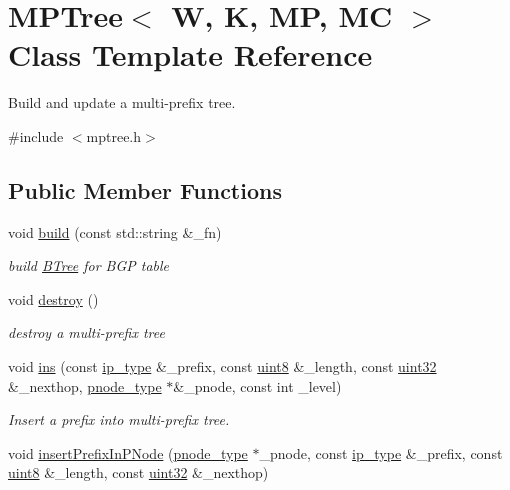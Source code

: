 \hypertarget{classMPTree}{\section{M\-P\-Tree$<$ W, K, M\-P, M\-C $>$ Class Template Reference}
\label{classMPTree}
}


Build and update a multi-\/prefix tree.  




{\ttfamily \#include $<$mptree.\-h$>$}

\subsection*{Public Member Functions}
\begin{DoxyCompactItemize}
\item 
void \hyperlink{classMPTree_af43cf4996e24c9d343923e4ea1db703a}{build} (const std\-::string \&\-\_\-fn)
\begin{DoxyCompactList}\small\item\em build \hyperlink{classBTree}{B\-Tree} for B\-G\-P table \end{DoxyCompactList}\item 
void \hyperlink{classMPTree_aadc3bf6841d9941a0a89101f9ad6eceb}{destroy} ()
\begin{DoxyCompactList}\small\item\em destroy a multi-\/prefix tree \end{DoxyCompactList}\item 
void \hyperlink{classMPTree_a0a3055fdb63dd614e55ec35630f6b48a}{ins} (const \hyperlink{classMPTree_a11032357a52017ffa6ad4e7ddedf3c23}{ip\-\_\-type} \&\-\_\-prefix, const \hyperlink{types_8h_a34ecedcf03a70dc91e4616212d79267d}{uint8} \&\-\_\-length, const \hyperlink{types_8h_abd01e8e67e3d94cab04ecaaf4f85ac1b}{uint32} \&\-\_\-nexthop, \hyperlink{classMPTree_aaccc544aa2a8703f51ca45951f37a279}{pnode\-\_\-type} $\ast$\&\-\_\-pnode, const int \-\_\-level)
\begin{DoxyCompactList}\small\item\em Insert a prefix into multi-\/prefix tree. \end{DoxyCompactList}\item 
void \hyperlink{classMPTree_a6008b5d92736c860bd15f1e2e60474f3}{insert\-Prefix\-In\-P\-Node} (\hyperlink{classMPTree_aaccc544aa2a8703f51ca45951f37a279}{pnode\-\_\-type} $\ast$\-\_\-pnode, const \hyperlink{classMPTree_a11032357a52017ffa6ad4e7ddedf3c23}{ip\-\_\-type} \&\-\_\-prefix, const \hyperlink{types_8h_a34ecedcf03a70dc91e4616212d79267d}{uint8} \&\-\_\-length, const \hyperlink{types_8h_abd01e8e67e3d94cab04ecaaf4f85ac1b}{uint32} \&\-\_\-nexthop)

\end{DoxyCompactItemize}
